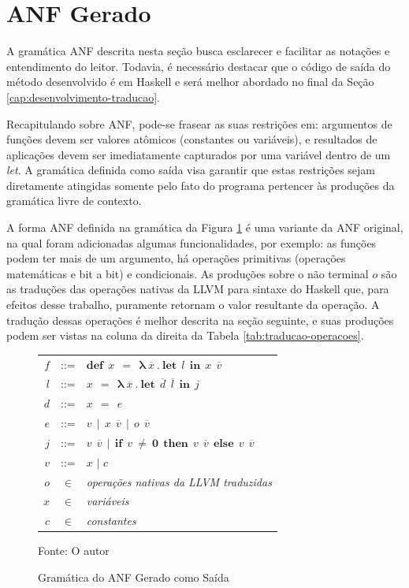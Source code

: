 \section{ANF Gerado}\label{sec:desenvolvimento-anf}

A gramática ANF descrita nesta seção busca esclarecer e facilitar as notações e entendimento do leitor. Todavia, é necessário destacar que o código de saída do método desenvolvido é em Haskell e será melhor abordado no final da Seção \ref{cap:desenvolvimento-traducao}.

Recapitulando sobre ANF, pode-se frasear as suas restrições em: argumentos de funções devem ser valores atômicos (constantes ou variáveis), e resultados de aplicações devem ser imediatamente capturados por uma variável dentro de um \emph{let}. A gramática definida como saída visa garantir que estas restrições sejam diretamente atingidas somente pelo fato do programa pertencer às produções da gramática livre de contexto.

A forma ANF definida na gramática da Figura \ref{fig:gramatica-saida} é uma variante da ANF original, na qual foram adicionadas algumas funcionalidades, por exemplo: as funções podem ter mais de um argumento, há operações primitivas (operações matemáticas e bit a bit) e condicionais. As produções sobre o não terminal $o$ são as traduções das operações nativas da LLVM para sintaxe do Haskell que, para efeitos desse trabalho, puramente retornam o valor resultante da operação. A tradução dessas operações é melhor descrita na seção seguinte, e suas produções podem ser vistas na coluna da direita da Tabela \ref{tab:traducao-operacoes}.

\begin{figure}[h]
\begin{center}
\large
\begin{tabular}{r@{\ \ }c@{\ \ }l}
    $f$ & ::= & $\textbf{def} \ \ x \ \ \boldsymbol{=} \ \ \boldsymbol{\lambda} \ \overline{x} \ . \ \textbf{let} \ \ l \ \ \textbf{in} \ \ 
    x \ \ \overline{v}$ \\
    $l$ & ::= & $x \ \ \boldsymbol{=} \ \ \boldsymbol{\lambda} \ \overline{x} \ . \ \textbf{let} \ \ \overline{d} \ \ \overline{l} \ \ \textbf{in} \ \ j$ \\
    $d$ & ::= & $x \ \ \boldsymbol{=} \ \ e$ \\
    $e$ & ::= & $v \ \ | \ \ x \ \ \overline{v} \ \ | \ \ o \ \ \overline{v}$ \\
    $j$ & ::= & $v \ \ \overline{v} \ \ | \ \ \textbf{if} \ \ v \ \boldsymbol{\neq} \ \mathbf{0 \ \ then} \ \ v \ \ \overline{v} \ \ \textbf{else} \ \ v \ \ \overline{v}$ \\
    $v$ & ::= & $x$ $|$ $c$ \\
    $o$ & $\in$ & \emph{operações nativas da LLVM traduzidas} \\
    $x$ & $\in$ & \emph{variáveis} \\
    $c$ & $\in$ & \emph{constantes} \\
\end{tabular}
\caption{Gramática do ANF Gerado como Saída}
\label{fig:gramatica-saida}
\small{Fonte: O autor}
\end{center}
\end{figure}

